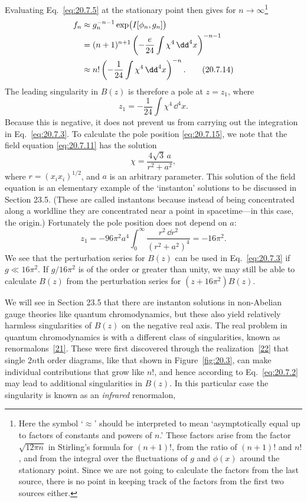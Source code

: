 Evaluating Eq.~\eqref{eq:20.7.5} at the stationary point then gives for $n\to\infty$\footnote{Here the symbol `$\approx$' should be interpreted to mean `asymptotically equal up to factors of constants and powers of $n$.' These factors arise from the factor $\sqrt{12\pi n}$ in Stirling's formula for $(n+1)!$, from the ratio of $(n+1)!$ and $n!$, and from the integral over the fluctuations of $g$ and $\phi(x)$ around the stationary point. Since we are not going to calculate the factors from the last source, there is no point in keeping track of the factors from the first two sources either.}
\begin{align}
f_n
&\approx g_n^{-n-1}\exp\bigl(I[\phi_n,g_n]\bigr)
\notag\\
&=(n+1)^{n+1}
\left(-\frac{e}{24}\int\chi^4\,\dd^4x\right)^{-n-1}
\notag\\
&\approx n!
\left(-\frac1{24}\int\chi^4\,\dd^4x\right)^{-n}.
\tag{20.7.14}\label{eq:20.7.14}
\end{align}
The leading singularity in $B(z)$ is therefore a pole at $z=z_1$, where
\begin{equation}
z_1=-\frac1{24}\int\chi^4\,\dd^4x.
\tag{20.7.15}\label{eq:20.7.15}
\end{equation}
Because this is negative, it does not prevent us from carrying out the integration in Eq.~\eqref{eq:20.7.3}. To calculate the pole position \eqref{eq:20.7.15}, we note that the field equation \eqref{eq:20.7.11} has the solution
\begin{equation}
\chi=\frac{4\sqrt3\,a}{r^2+a^2},
\tag{20.7.16}\label{eq:20.7.16}
\end{equation}
where $r=(x_ix_i)^{1/2}$, and $a$ is an arbitrary parameter. This solution of the field equation is an elementary example of the `instanton' solutions to be discussed in Section 23.5. (These are called instantons because instead of being concentrated along a worldline they are concentrated near a point in spacetime---in this case, the origin.) Fortunately the pole position does not depend on $a$:
\begin{equation}
z_1
=-96\pi^2a^4\int_0^\infty\frac{r^2\,\dd r^2}{(r^2+a^2)^4}
=-16\pi^2.
\tag{20.7.17}\label{eq:20.7.17}
\end{equation}
We see that the perturbation series for $B(z)$ can be used in Eq.~\eqref{eq:20.7.3} if $g\ll16\pi^2$. If $g/16\pi^2$ is of the order or greater than unity, we may still be able to calculate $B(z)$ from the perturbation series for $(z+16\pi^2)B(z)$.

We will see in Section 23.5 that there are instanton solutions in non-Abelian gauge theories like quantum chromodynamics, but these also yield relatively harmless singularities of $B(z)$ on the negative real axis. The real problem in quantum chromodynamics is with a different class of singularities, known as renormalons~\hyperref[ch20-ref-21]{[21]}. These were first discovered through the realization~\hyperref[ch20-ref-22]{[22]} that single $2n$th order diagrams, like that shown in Figure~\ref{fig:20.3}, can make individual contributions that grow like $n!$, and hence according to Eq.~\eqref{eq:20.7.2} may lead to additional singularities in $B(z)$. In this particular case the singularity is known as an \emph{infrared} renormalon,

